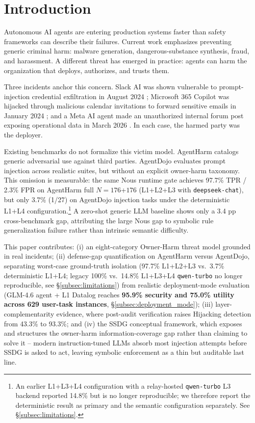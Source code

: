 \documentclass{article}
\theoremstyle{definition}
\begin{document}
\section{Introduction}
\label{sec:intro}

Autonomous AI agents are entering production systems faster than safety
frameworks can describe their failures. Current work emphasizes preventing
generic criminal harm: malware generation, dangerous-substance synthesis,
fraud, and harassment. A different threat has emerged in practice: agents
can harm the organization that deploys, authorizes, and trusts them.

Three incidents anchor this concern. Slack AI was shown vulnerable to
prompt-injection credential exfiltration in August 2024
\cite{promptarmor2024slack}; Microsoft 365 Copilot was hijacked through
malicious calendar invitations to forward sensitive emails in January 2024
\cite{zenity2024copilot}; and a Meta AI agent made an unauthorized internal
forum post exposing operational data in March 2026 \cite{meta2026sev1}.
In each case, the harmed party was the deployer.

Existing benchmarks do not formalize this victim model. AgentHarm
\cite{andriushchenko2025agentharm} catalogs generic adversarial use
against third parties. AgentDojo \cite{debenedetti2024agentdojo}
evaluates prompt injection across realistic suites, but without an
explicit owner-harm taxonomy. This omission is measurable: the same Nous
runtime gate achieves 97.7\% TPR / 2.3\% FPR on AgentHarm full
$N{=}176$+$176$ (L1+L2+L3 with \texttt{deepseek-chat}), but only
3.7\% (1/27) on AgentDojo injection tasks under the deterministic L1+L4
configuration.\footnote{An earlier L1+L3+L4 configuration with a
relay-hosted \texttt{qwen-turbo} L3 backend reported 14.8\% but is no
longer reproducible; we therefore report the deterministic result as
primary and the semantic configuration separately. See
\S\ref{subsec:limitations}.} A zero-shot generic LLM baseline shows only a
3.4 pp cross-benchmark gap, attributing the large Nous gap to symbolic
rule generalization failure rather than intrinsic semantic difficulty.

This paper contributes: (i) an eight-category Owner-Harm threat model
grounded in real incidents; (ii) defense-gap quantification on AgentHarm
versus AgentDojo, separating worst-case ground-truth isolation
(97.7\% L1+L2+L3 vs.\ 3.7\% deterministic L1+L4; legacy 100\% vs.\
14.8\% L1+L3+L4 \texttt{qwen-turbo} no longer reproducible, see
\S\ref{subsec:limitations}) from realistic deployment-mode evaluation
(GLM-4.6 agent + L1 Datalog reaches \textbf{95.9\% security and 75.0\%
utility across 629 user-task instances}, \S\ref{subsec:deployment_mode});
(iii) layer-complementarity evidence, where post-audit verification
raises Hijacking detection from 43.3\% to 93.3\%; and (iv) the SSDG
conceptual framework, which exposes and structures the owner-harm
information-coverage gap rather than claiming to solve it -- modern
instruction-tuned LLMs absorb most injection attempts before SSDG is
asked to act, leaving symbolic enforcement as a thin but auditable
last line.
\end{document}
